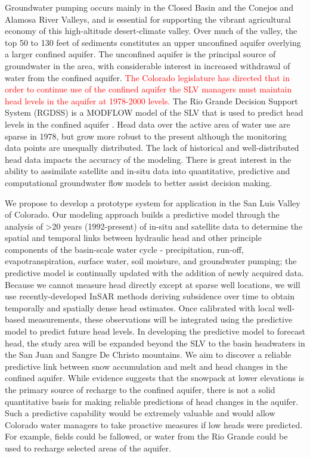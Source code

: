 \documentclass[11pt,final]{article}%
\renewcommand{\citep}{\cite}
\begin{document}
Groundwater pumping occurs mainly in the Closed Basin and the Conejos and Alamosa River Valleys, and is essential for supporting the vibrant agricultural economy of this high-altitude desert-climate valley. Over much of the valley, the top 50 to 130 feet of sediments constitutes an upper unconfined aquifer overlying a larger confined aquifer. The unconfined aquifer is the principal source of groundwater in the area, with considerable interest in increased withdrawal of water from the confined aquifer.  \textcolor{red}{The Colorado legislature has directed that in order to continue use of the confined aquifer the SLV managers must maintain head levels in the aquifer at 1978-2000 levels.} The Rio Grande Decision Support System (RGDSS) is a MODFLOW model of the SLV that is used to predict head levels in the confined aquifer  \citep{RGDSS}.  Head data over the active area of water use are sparse in 1978, but grow more robust to the present although the monitoring data points are unequally distributed. The lack of historical and well-distributed head data impacts the accuracy of the modeling.  There is great interest in the ability to assimilate satellite and in-situ data into quantitative, predictive and computational groundwater flow models to better assist decision making.

We propose to develop a prototype system for application in the San Luis Valley of Colorado. Our modeling approach builds a predictive model through the analysis of >20 years (1992-present) of in-situ and satellite data to determine the spatial and temporal links between hydraulic head and other principle components of the basin-scale water cycle - precipitation, run-off, evapotranspiration, surface water, soil moisture, and groundwater pumping; the predictive model is continually updated with the addition of newly acquired data. Because we cannot measure head directly except at sparse well locations, we will use recently-developed InSAR methods deriving subsidence over time to obtain temporally and spatially dense head estimates.  Once calibrated with local well-based measurements, these observations will be integrated using the predictive model to predict future head levels. In developing the predictive model to forecast head, the study area will be expanded beyond the SLV to the basin headwaters in the San Juan and Sangre De Christo mountains. We aim to discover a reliable predictive link between snow accumulation and melt and head changes in the confined aquifer.  While evidence suggests that the snowpack at lower elevations is the primary source of recharge to the confined aquifer, there is not a solid quantitative basis for making reliable predictions of head changes in the aquifer.  Such a predictive capability would be extremely valuable and would allow Colorado water managers to take proactive measures if low heads were predicted.  For example, fields could be fallowed, or water from the Rio Grande could be used to recharge selected areas of the aquifer.
\end{document}
